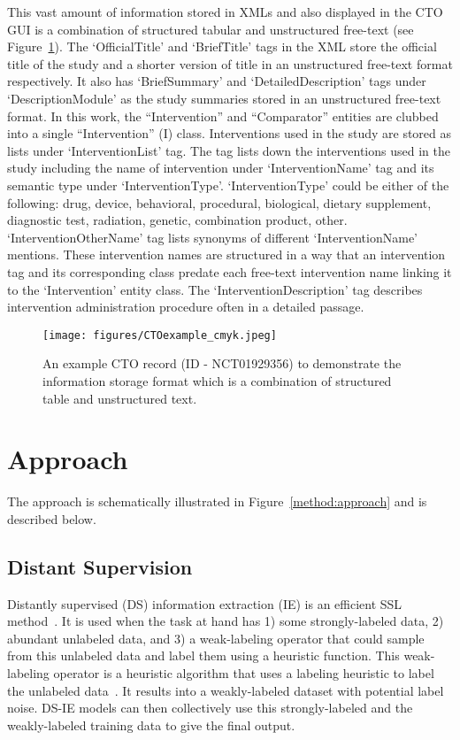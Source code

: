 \documentclass[letterpaper]{article} %
\begin{document}
This vast amount of information stored in XMLs and also displayed in the CTO GUI is a combination of structured tabular and unstructured free-text (see Figure~\ref{fig:CTO_example}).
The `OfficialTitle' and `BriefTitle' tags in the XML store the official title of the study and a shorter version of title in an unstructured free-text format respectively.
It also has `BriefSummary' and `DetailedDescription' tags under `DescriptionModule' as the study summaries stored in an unstructured free-text format.
In this work, the ``Intervention'' and ``Comparator'' entities are clubbed into a single ``Intervention'' (I) class.
Interventions used in the study are stored as lists under `InterventionList' tag.
The tag lists down the interventions used in the study including the name of intervention under `InterventionName' tag and its semantic type under `InterventionType'.
`InterventionType' could be either of the following: drug, device, behavioral, procedural, biological, dietary supplement, diagnostic test, radiation, genetic, combination product, other.
`InterventionOtherName' tag lists synonyms of different `InterventionName' mentions.
These intervention names are structured in a way that an intervention tag and its corresponding class predate each free-text intervention name linking it to the `Intervention' entity class.
The `InterventionDescription' tag describes intervention administration procedure often in a detailed passage.
%
\begin{figure}[t]
\centering
\texttt{[image: figures/CTOexample\_cmyk.jpeg]}
\caption{An example CTO record (ID - NCT01929356) to demonstrate the information storage format which is a combination of structured table and unstructured text.}
\label{fig:CTO_example}
\end{figure}
%
\section{Approach}
\label{sec:methods}
%
The approach is schematically illustrated in Figure~\ref{method:approach} and is described below.
%
\subsection{Distant Supervision}
\label{subsec:ds}
%
Distantly supervised (DS) information extraction (IE) is an efficient SSL method~\cite{etzioni2008open,wen2019efficient}.
It is used when the task at hand has 1) some strongly-labeled data, 2) abundant unlabeled data, and 3) a weak-labeling operator that could sample from this unlabeled data and label them using a heuristic function.
This weak-labeling operator is a heuristic algorithm that uses a labeling heuristic to label the unlabeled data~\cite{pinto2003table, greaves2014relation}.
It results into a weakly-labeled dataset with potential label noise.
DS-IE models can then collectively use this strongly-labeled and the weakly-labeled training data to give the final output.
%
\end{document}
